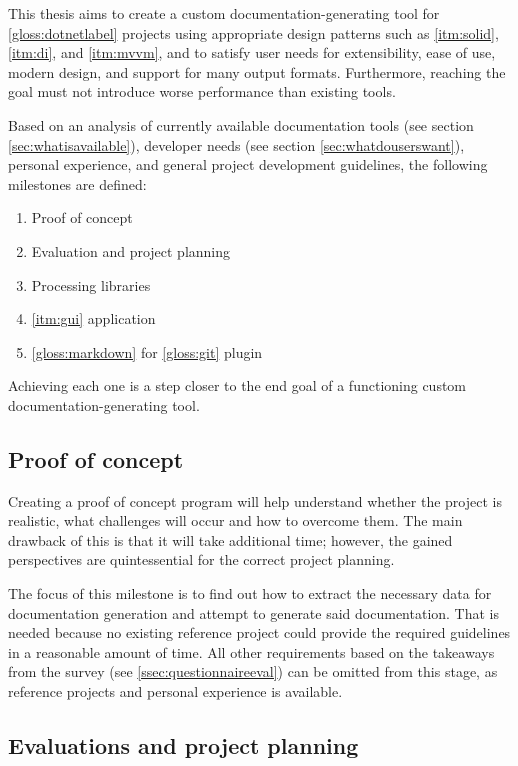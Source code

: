 This thesis aims to create a custom documentation-generating tool for \ref{gloss:dotnetlabel} projects using appropriate design patterns such as \ref{itm:solid}, \ref{itm:di}, and \ref{itm:mvvm}, and to satisfy user needs for extensibility, ease of use, modern design, and support for many output formats. Furthermore, reaching the goal must not introduce worse performance than existing tools.

Based on an analysis of currently available documentation tools (see section \ref{sec:whatisavailable}), developer needs (see section \ref{sec:whatdouserswant}), personal experience, and general project development guidelines, the following milestones are defined:
\begin{enumerate}
    \item Proof of concept
    \item Evaluation and project planning
    \item Processing libraries
    \item \ref{itm:gui} application
    \item \ref{gloss:markdown} for \ref{gloss:git} plugin
\end{enumerate}

Achieving each one is a step closer to the end goal of a functioning custom documentation-generating tool.

\subsection*{Proof of concept} \label{subSecProofOfConcept}

Creating a proof of concept program will help understand whether the project is realistic, what challenges will occur and how to overcome them.
The main drawback of this is that it will take additional time; however, the gained perspectives are quintessential for the correct project planning.

The focus of this milestone is to find out how to extract the necessary data for documentation generation and attempt to generate said documentation.
That is needed because no existing reference project could provide the required guidelines in a reasonable amount of time.
All other requirements based on the takeaways from the survey (see \ref{ssec:questionnaireeval}) can be omitted from this stage, as reference projects and personal experience is available.

\subsection*{Evaluations and project planning} \label{subSecEvalProjPlanning}

